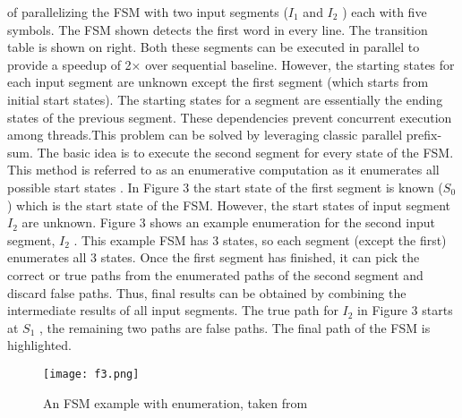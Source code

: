 of parallelizing the FSM with two input segments ($I_1$ and $I_2$ ) each
with five symbols. The FSM shown detects the first word in every
line. The transition table is shown on right. Both these segments can
be executed in parallel to provide a speedup of 2× over sequential
baseline.
However, the starting states for each input segment are unknown
except the first segment (which starts from initial start states). The
starting states for a segment are essentially the ending states of the previous segment. These dependencies prevent concurrent execution
among threads.This problem can be solved by leveraging classic
parallel prefix-sum. The basic idea is to execute the second
segment for every state of the FSM. This method is referred to
as an enumerative computation as it enumerates all possible start
states \cite{2}.
In Figure 3 the start state of the first segment is known ($S_0$)
which is the start state of the FSM. However, the start states of input
segment $I_2$ are unknown. Figure 3 shows an example enumeration
for the second input segment, $I_2$ . This example FSM has 3 states,
so each segment (except the first) enumerates all 3 states. Once the
first segment has finished, it can pick the correct or true paths from
the enumerated paths of the second segment and discard false paths.
Thus, final results can be obtained by combining the intermediate
results of all input segments. The true path for $I_2$ in Figure 3 starts
at $S_1$ , the remaining two paths are false paths. The final path of the
FSM is highlighted.
\begin{figure}[!h]
    \texttt{[image: f3.png]}
    \caption{An FSM example with enumeration, taken from \cite{}}
\end{figure}